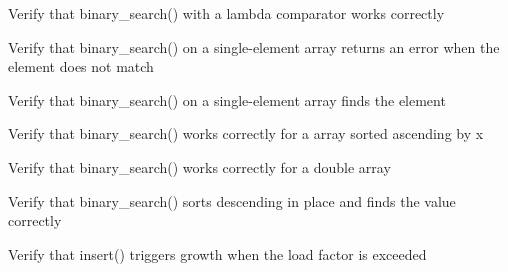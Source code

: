 \begin{DoxyRefList}
\item[Global \doxylink{test__array_8cpp_a9819aa867850cb161f212c0dd712f607}{TEST\+\_\+F} (\doxylink{classArrayInitTest}{Array\+Init\+Test}, Binary\+Search\+Int\+With\+Lambda\+Comparator)]\label{test__test000198}%
%
Verify that binary\+\_\+search() with a lambda comparator works correctly  
\item[Global \doxylink{test__array_8cpp_a0fd548e7d0a6ecc42d0b12969986a6ec}{TEST\+\_\+F} (\doxylink{classArrayInitTest}{Array\+Init\+Test}, Binary\+Search\+Int\+Single\+Element\+No\+Match)]\label{test__test000191}%
%
Verify that binary\+\_\+search() on a single-\/element array returns an error when the element does not match  
\item[Global \doxylink{test__array_8cpp_a06f79d07dcbe4cbc29d4b3c392bd6ec6}{TEST\+\_\+F} (\doxylink{classArrayInitTest}{Array\+Init\+Test}, Binary\+Search\+Int\+Single\+Element\+Match)]\label{test__test000190}%
%
Verify that binary\+\_\+search() on a single-\/element array finds the element  
\item[Global \doxylink{test__array_8cpp_a1e21ba156be12f006646d3f0b17afd06}{TEST\+\_\+F} (\doxylink{classArrayInitTest}{Array\+Init\+Test}, Binary\+Search\+Point\+Ascending\+ByX)]\label{test__test000196}%
%
Verify that binary\+\_\+search() works correctly for a  array sorted ascending by x  
\item[Global \doxylink{test__array_8cpp_a0b46b1ffdd893197716486088de22796}{TEST\+\_\+F} (\doxylink{classArrayInitTest}{Array\+Init\+Test}, Binary\+Search\+Double\+Ascending)]\label{test__test000195}%
%
Verify that binary\+\_\+search() works correctly for a double array  
\item[Global \doxylink{test__array_8cpp_a37344977464653aa2990840c096cc4d3}{TEST\+\_\+F} (\doxylink{classArrayInitTest}{Array\+Init\+Test}, Binary\+Search\+Int\+Sorts\+Descending\+In\+Place)]\label{test__test000194}%
%
Verify that binary\+\_\+search() sorts descending in place and finds the value correctly  
\item[Global \doxylink{test__dict_8cpp_a5a718610ae4a9154ed02e144d164004e}{TEST\+\_\+F} (\doxylink{classDictTest}{Dict\+Test}, Insert\+Triggers\+Growth)]\label{test__test000224}%
%
Verify that insert() triggers growth when the load factor is exceeded  
\item[Global \doxylink{test__array_8cpp_a3cf30eac4fa6635e562e9a6c820140e8}{TEST\+\_\+F} (\doxylink{classArrayInitTest}{Array\+Init\+Test}, Binary\+Search\+Int\+Descending\+Presorted)]\label{test__test000193}%

\end{DoxyRefList}
